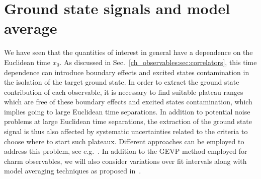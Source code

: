 

\section{Ground state signals and model average}
\label{ch_observables:sec:MA}

We have seen that the quantities of interest in general have a dependence on the Euclidean time $x_0$. As discussed in Sec.~\ref{ch_observables:sec:correlators}, this time dependence can introduce boundary effects and excited states contamination in the isolation of the target ground state. In order to extract the ground state contribution of each observable, it is necessary to find suitable plateau ranges which are free of these boundary effects and excited states contamination, which implies going to large Euclidean time separations. In addition to potential noise problems at large Euclidean time separations, the extraction of the ground state signal is thus also affected by systematic uncertainties related to the criteria to choose where to start such plateaux. Different approaches can be employed to address this problem, see e.g.~\citep{Strassberger:2023xnj,Bruno:2016plf,RQCD_scale}. In addition to the GEVP method employed for charm observables, we will also consider variations over fit intervals along with model averaging techniques as proposed in~\citep{Neil:2022joj,Neil:2023pgt,Frison:2023jbv}.

